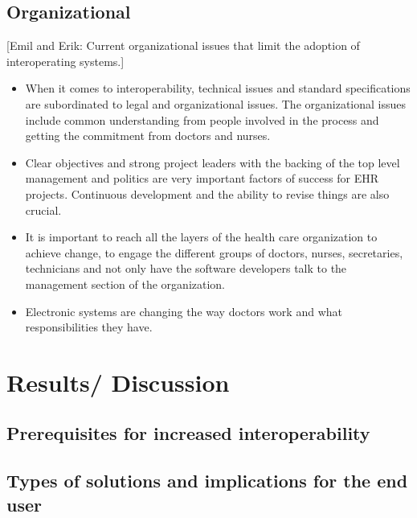 \documentclass[14pt]{article}
\begin{document}
\subsection{Organizational}

[Emil and Erik: Current organizational issues that limit the adoption of interoperating systems.]

\begin{itemize}
\item When it comes to \gls{interoperability}, technical issues and standard specifications are subordinated to legal and organizational issues. The organizational issues include common understanding from people involved in the process and getting the commitment from doctors and nurses. 
\item Clear objectives and strong project leaders with the backing of the top level management and politics are very important factors of success for \gls{EHR} projects. Continuous development and the ability to revise things are also crucial.
\item It is important to reach all the layers of the health care organization to achieve change, to engage the different groups of doctors, nurses, secretaries, technicians and not only have the software developers talk to the management section of the organization.
\item Electronic systems are changing the way doctors work and what responsibilities they have.
\end{itemize}

\newpage

\section{Results/ Discussion}
\label{sec:Results}

\subsection{Prerequisites for increased interoperability}

\subsection{Types of solutions and implications for the end user}
\end{document}
